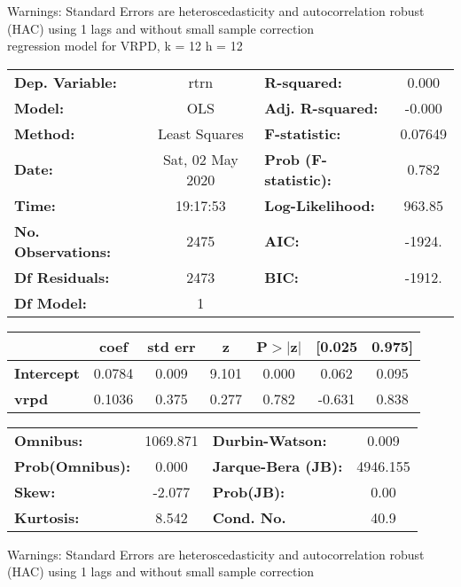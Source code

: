 Warnings: \newline
 [1] Standard Errors are heteroscedasticity and autocorrelation robust (HAC) using 1 lags and without small sample correction\\ 

regression model for VRPD, k = 12 h = 12\begin{center}
\begin{tabular}{lclc}
\toprule
\textbf{Dep. Variable:}    &       rtrn       & \textbf{  R-squared:         } &     0.000   \\
\textbf{Model:}            &       OLS        & \textbf{  Adj. R-squared:    } &    -0.000   \\
\textbf{Method:}           &  Least Squares   & \textbf{  F-statistic:       } &   0.07649   \\
\textbf{Date:}             & Sat, 02 May 2020 & \textbf{  Prob (F-statistic):} &    0.782    \\
\textbf{Time:}             &     19:17:53     & \textbf{  Log-Likelihood:    } &    963.85   \\
\textbf{No. Observations:} &        2475      & \textbf{  AIC:               } &    -1924.   \\
\textbf{Df Residuals:}     &        2473      & \textbf{  BIC:               } &    -1912.   \\
\textbf{Df Model:}         &           1      & \textbf{                     } &             \\
\bottomrule
\end{tabular}
\begin{tabular}{lcccccc}
                   & \textbf{coef} & \textbf{std err} & \textbf{z} & \textbf{P$> |$z$|$} & \textbf{[0.025} & \textbf{0.975]}  \\
\midrule
\textbf{Intercept} &       0.0784  &        0.009     &     9.101  &         0.000        &        0.062    &        0.095     \\
\textbf{vrpd}      &       0.1036  &        0.375     &     0.277  &         0.782        &       -0.631    &        0.838     \\
\bottomrule
\end{tabular}
\begin{tabular}{lclc}
\textbf{Omnibus:}       & 1069.871 & \textbf{  Durbin-Watson:     } &    0.009  \\
\textbf{Prob(Omnibus):} &   0.000  & \textbf{  Jarque-Bera (JB):  } & 4946.155  \\
\textbf{Skew:}          &  -2.077  & \textbf{  Prob(JB):          } &     0.00  \\
\textbf{Kurtosis:}      &   8.542  & \textbf{  Cond. No.          } &     40.9  \\
\bottomrule
\end{tabular}
\end{center}

Warnings: \newline
 [1] Standard Errors are heteroscedasticity and autocorrelation robust (HAC) using 1 lags and without small sample correction\\ 

